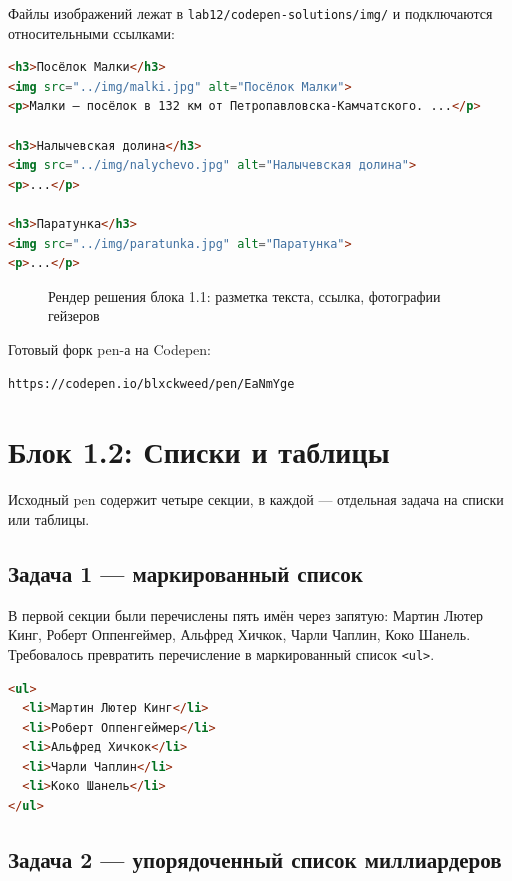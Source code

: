 Файлы изображений лежат в \texttt{lab12/codepen-solutions/img/} и
подключаются относительными ссылками:
\begin{lstlisting}[language=HTML]
<h3>Посёлок Малки</h3>
<img src="../img/malki.jpg" alt="Посёлок Малки">
<p>Малки – посёлок в 132 км от Петропавловска-Камчатского. ...</p>

<h3>Налычевская долина</h3>
<img src="../img/nalychevo.jpg" alt="Налычевская долина">
<p>...</p>

<h3>Паратунка</h3>
<img src="../img/paratunka.jpg" alt="Паратунка">
<p>...</p>
\end{lstlisting}

\begin{figure}[h]
  \centering
  \caption{Рендер решения блока 1.1: разметка текста, ссылка, фотографии гейзеров}
  \label{fig:block_1_1}
\end{figure}

Готовый форк pen-а на Codepen:
\begin{lstlisting}
https://codepen.io/blxckweed/pen/EaNmYge
\end{lstlisting}

\section{Блок 1.2: Списки и таблицы}

Исходный pen содержит четыре секции, в каждой --- отдельная задача на
списки или таблицы.

\subsection{Задача 1 --- маркированный список}

В первой секции были перечислены пять имён через запятую:
Мартин Лютер Кинг, Роберт Оппенгеймер, Альфред Хичкок, Чарли Чаплин,
Коко Шанель. Требовалось превратить перечисление в маркированный
список \texttt{<ul>}.

\begin{lstlisting}[language=HTML]
<ul>
  <li>Мартин Лютер Кинг</li>
  <li>Роберт Оппенгеймер</li>
  <li>Альфред Хичкок</li>
  <li>Чарли Чаплин</li>
  <li>Коко Шанель</li>
</ul>
\end{lstlisting}

\subsection{Задача 2 --- упорядоченный список миллиардеров}

